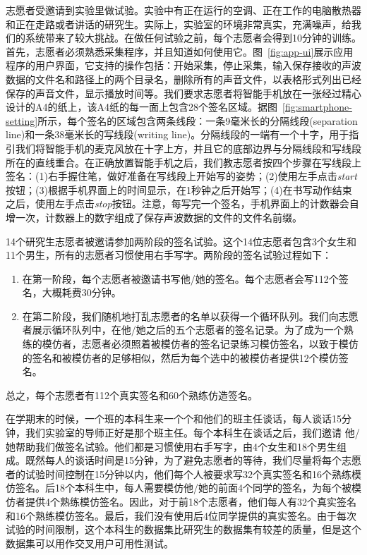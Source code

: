 志愿者受邀请到实验里做试验。实验中有正在运行的空调、正在工作的电脑散热器和正在走路或者讲话的研究生。实际上，实验室的环境非常真实，充满噪声，给我们的系统带来了较大挑战。在做任何试验之前，每个志愿者会得到10分钟的训练。首先，志愿者必须熟悉采集程序，并且知道如何使用它。图~\ref{fig:app-ui}展示应用程序的用户界面，它支持的操作包括：开始采集，停止采集，输入保存接收的声波数据的文件名和路径上的两个目录名，删除所有的声音文件，以表格形式列出已经保存的声音文件，显示播放时间等。我们要求志愿者将智能手机放在一张经过精心设计的A4的纸上，该A4纸的每一面上包含28个签名区域。据图~\ref{fig:smartphone-setting}所示，每个签名的区域包含两条线段：一条9毫米长的分隔线段(separation line)和一条38毫米长的写线段(writing line)。分隔线段的一端有一个十字，用于指引我们将智能手机的麦克风放在十字上方，并且它的底部边界与分隔线段和写线段所在的直线重合。在正确放置智能手机之后，我们教志愿者按四个步骤在写线段上签名：(1)右手握住笔，做好准备在写线段上开始写的姿势；(2)使用左手点击\textit{start}按钮；(3)根据手机界面上的时间显示，在1秒钟之后开始写；(4)在书写动作结束之后，使用左手点击\textit{stop}按钮。注意，每写完一个签名，手机界面上的计数器会自增一次，计数器上的数字组成了保存声波数据的文件的文件名前缀。

14个研究生志愿者被邀请参加两阶段的签名试验。这个14位志愿者包含3个女生和11个男生，所有的志愿者习惯使用右手写字。两阶段的签名试验过程如下：
\begin{enumerate}[label=(\arabic*)]
    \item 在第一阶段，每个志愿者被邀请书写他/她的签名。每个志愿者会写112个签名，大概耗费30分钟。
    \item 在第二阶段，我们随机地打乱志愿者的名单以获得一个循环队列。我们向志愿者展示循环队列中，在他/她之后的五个志愿者的签名记录。为了成为一个熟练的模仿者，志愿者必须照着被模仿者的签名记录练习模仿签名，以致于模仿的签名和被模仿者的足够相似，然后为每个选中的被模仿者提供12个模仿签名。
\end{enumerate}
总之，每个志愿者有112个真实签名和60个熟练仿造签名。

在学期末的时候，一个班的本科生来一个个和他们的班主任谈话，每人谈话15分钟，我们实验室的导师正好是那个班主任。每个本科生在谈话之后，我们邀请
他/她帮助我们做签名试验。他们都是习惯使用右手写字，由4个女生和18个男生组成。既然每人的谈话时间是15分钟，为了避免志愿者的等待，我们尽量将每个志愿者的试验时间控制在15分钟以内，他们每个人被要求写32个真实签名和16个熟练模仿签名。后18个本科生中，每人需要模仿他/她的前面4个同学的签名，为每个被模仿者提供4个熟练模仿签名。因此，对于前18个志愿者，他们每人有32个真实签名和16个熟练模仿签名。最后，我们没有使用后4位同学提供的真实签名。由于每次试验的时间限制，这个本科生的数据集比研究生的数据集有较差的质量，但是这个数据集可以用作交叉用户可用性测试。

